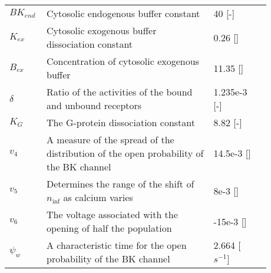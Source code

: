\begin{table}[h!]
	\centering
	\begin{tabular}{| p{0.09\linewidth} | >{\footnotesize} p{0.6\linewidth} | >{\footnotesize} p{0.17\linewidth} | >{\footnotesize} p{0.02\linewidth} |}
		\arrayrulecolor{lightgrey}\hline
		
		$BK_{end}$      & Cytosolic endogenous buffer constant                              & 40 [-] & \cite{LoesEvert} \\
		$K_{ex}$        & Cytosolic exogenous buffer dissociation constant                  & 0.26 [\uM] & \cite{LoesEvert} \\
		$B_{ex}$        & Concentration of cytosolic exogenous buffer                       & 11.35 [\uM] & \cite{LoesEvert} \\
		$\delta$        & Ratio of the activities of the bound and unbound receptors        & 1.235e-3 [-] & \cite{Farr2011}\\
		$K_G$           & The G-protein dissociation constant                               & 8.82  [-] & \cite{Farr2011}\\
		$v_{4}$			& A measure of the spread of the distribution of the open probability of the BK channel	& 14.5e-3 [\Volt]   &  \cite{Gonzalez1994} \\
		$v_{5}$			& Determines the range of the shift of $n_{\inf}$ as calcium varies    	& 8e-3 [\Volt]  & \cite{Farr2011}  \\
		$v_{6}$			& The voltage associated with the opening of half the population		& -15e-3 [\Volt]  & \cite{Farr2011}  \\
		$ \psi_{w}$    	& A characteristic time for the open probability of the BK channel		& 2.664 [$s^{-1}$] & \cite{Gonzalez1994} \\
		
		\hline
	\end{tabular}
\end{table}
